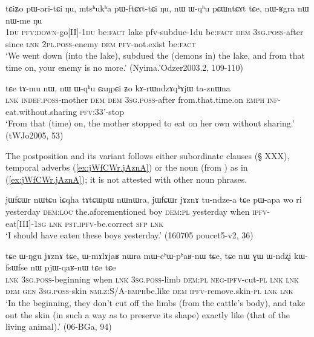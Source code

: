   \begin{exe}
\ex \label{ex:nW.Wqhu.pCintCAt}
 \gll  tɕiʑo pɯ-ari-tɕi ŋu, mtsʰukʰa pɯ-ftɕɤt-tɕi ŋu, nɯ ɯ-qʰu pɕɯntɕɤt tɕe,  nɯ-ʁgra nɯ nɯ-me ŋu \\
 \textsc{1du} \textsc{pfv}:\textsc{down}-go[II]-\textsc{1du} be:\textsc{fact} lake pfv-subdue-1du be:\textsc{fact} \textsc{dem} \textsc{3sg}.\textsc{poss}-after since \textsc{lnk} \textsc{2pl}.\textsc{poss}-enemy \textsc{dem} \textsc{pfv}-not.exist be:\textsc{fact} \\
 \glt `We went down (into the lake), subdued the (demons in) the lake, and from that time on, your enemy is no more.' (Nyima.'Odzer2003.2, 109-110)
 \end{exe}
 
 \begin{exe}
\ex \label{ex:Wqhu.CaNpCi}
\gll  tɕe tɤ-mu nɯ, nɯ ɯ-qʰu ɕaŋpɕi ʑo kɤ-rɯndzɤqʰɤjɯ ta-znɯna \\
\textsc{lnk} \textsc{indef}.\textsc{poss}-mother \textsc{dem} \textsc{dem} \textsc{3sg}.\textsc{poss}-after from.that.time.on \textsc{emph} \textsc{inf}-eat.without.sharing \textsc{pfv}:3\fl{}3'-stop \\
\glt `From that (time) on, the mother stopped to eat on her own without sharing.' (tWJo2005, 53) 
\end{exe}

The postposition  and its variant  follows either subordinate clauses (§ XXX), temporal adverbs (\ref{ex:jWfCWr.jAznA}) or the noun  (from ) as in (\ref{ex:jWfCWr.jAznA}); it is not attested with other noun phrases.

\begin{exe}
\ex \label{ex:jWfCWr.jAznA}
\gll  jɯfɕɯr nɯtɕu iɕqha tɤtɕɯpɯ nɯnɯra, jɯfɕɯr jɤznɤ tu-ndze-a tɕe pɯ-apa wo ri \\ 
yesterday \textsc{dem}:\textsc{loc} the.aforementioned boy \textsc{dem}:\textsc{pl} yesterday when \textsc{ipfv}-eat[III]-\textsc{1sg}  \textsc{lnk} \textsc{pst}.\textsc{ipfv}-be.correct \textsc{sfp} \textsc{lnk} \\
\glt  `I should have eaten these boys yesterday.' (160705 poucet5-v2, 36)
\end{exe}

 \begin{exe}
\ex \label{ex:WNgu.jAznA}
\gll  tɕe ɯ-ŋgu jɤznɤ tɕe, ɯ-mɤlɤjaʁ nɯra mɯ-cʰɯ-pʰaʁ-nɯ tɕe,  tɕe nɯ ɣɯ ɯ-ndʐi kɯ-fsɯ\redp{}fse nɯ pjɯ-qaʁ-nɯ tɕe tɕe \\
\textsc{lnk} \textsc{3sg}.\textsc{poss}-beginning when \textsc{lnk} \textsc{3sg}.\textsc{poss}-limb \textsc{dem}:\textsc{pl} \textsc{neg}-\textsc{ipfv}-cut-\textsc{pl} \textsc{lnk} \textsc{lnk} \textsc{dem} \textsc{gen} \textsc{3sg}.\textsc{poss}-skin \textsc{nmlz}:S/A-\textsc{emph}\redp{}be.like \textsc{dem} \textsc{ipfv}-remove.skin-\textsc{pl} \textsc{lnk} \textsc{lnk} \\
\glt `In the beginning, they don't cut off the limbs (from the cattle's body), and take out the skin (in such a way as to preserve its shape) exactly like (that of the living animal).' (06-BGa, 94)
\end{exe}


